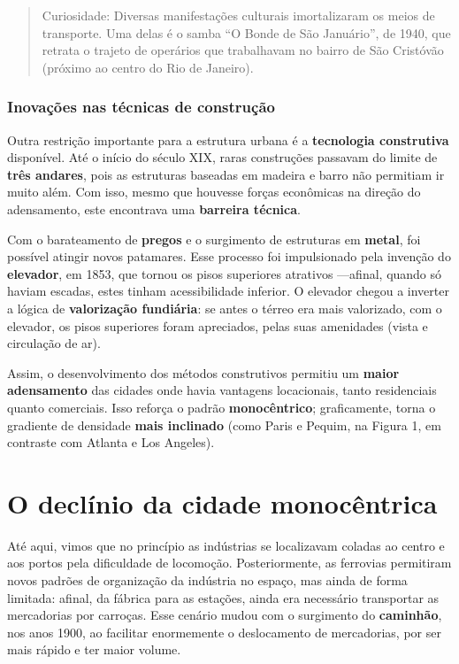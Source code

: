 \documentclass[
  12pt,
  a4paper,
]{article}
\begin{document}
\begin{quote}
Curiosidade: Diversas manifestações culturais imortalizaram os meios de
transporte. Uma delas é o samba ``O Bonde de São Januário'', de 1940,
que retrata o trajeto de operários que trabalhavam no bairro de São
Cristóvão (próximo ao centro do Rio de Janeiro).
\end{quote}

\hypertarget{inovauxe7uxf5es-nas-tuxe9cnicas-de-construuxe7uxe3o}{%
\subsubsection{Inovações nas técnicas de
construção}\label{inovauxe7uxf5es-nas-tuxe9cnicas-de-construuxe7uxe3o}}

Outra restrição importante para a estrutura urbana é a
\textbf{tecnologia construtiva} disponível. Até o início do século XIX,
raras construções passavam do limite de \textbf{três andares}, pois as
estruturas baseadas em madeira e barro não permitiam ir muito além. Com
isso, mesmo que houvesse forças econômicas na direção do adensamento,
este encontrava uma \textbf{barreira técnica}.

Com o barateamento de \textbf{pregos} e o surgimento de estruturas em
\textbf{metal}, foi possível atingir novos patamares. Esse processo foi
impulsionado pela invenção do \textbf{elevador}, em 1853, que tornou os
pisos superiores atrativos ---afinal, quando só haviam escadas, estes
tinham acessibilidade inferior. O elevador chegou a inverter a lógica de
\textbf{valorização fundiária}: se antes o térreo era mais valorizado,
com o elevador, os pisos superiores foram apreciados, pelas suas
amenidades (vista e circulação de ar).

Assim, o desenvolvimento dos métodos construtivos permitiu um
\textbf{maior adensamento} das cidades onde havia vantagens locacionais,
tanto residenciais quanto comerciais. Isso reforça o padrão
\textbf{monocêntrico}; graficamente, torna o gradiente de densidade
\textbf{mais inclinado} (como Paris e Pequim, na Figura 1, em contraste
com Atlanta e Los Angeles).

\hypertarget{o-decluxednio-da-cidade-monocuxeantrica}{%
\section{O declínio da cidade
monocêntrica}\label{o-decluxednio-da-cidade-monocuxeantrica}}

Até aqui, vimos que no princípio as indústrias se localizavam coladas ao
centro e aos portos pela dificuldade de locomoção. Posteriormente, as
ferrovias permitiram novos padrões de organização da indústria no
espaço, mas ainda de forma limitada: afinal, da fábrica para as
estações, ainda era necessário transportar as mercadorias por carroças.
Esse cenário mudou com o surgimento do \textbf{caminhão}, nos anos 1900,
ao facilitar enormemente o deslocamento de mercadorias, por ser mais
rápido e ter maior volume.
\end{document}
